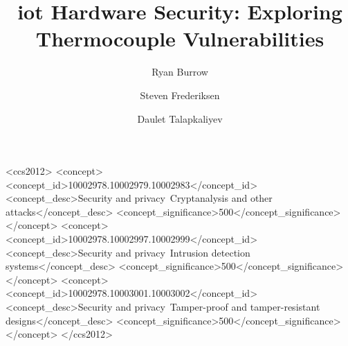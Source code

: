 \documentclass[sigconf,numbers,sort&compress]{acmart}
\begin{document}
\title{\ac{iot} Hardware Security: Exploring Thermocouple Vulnerabilities}

\author{Ryan Burrow}

\author{Steven Frederiksen}

\author{Daulet Talapkaliyev}




%
%
\begin{CCSXML}
<ccs2012>
<concept>
<concept_id>10002978.10002979.10002983</concept_id>
<concept_desc>Security and privacy~Cryptanalysis and other attacks</concept_desc>
<concept_significance>500</concept_significance>
</concept>
<concept>
<concept_id>10002978.10002997.10002999</concept_id>
<concept_desc>Security and privacy~Intrusion detection systems</concept_desc>
<concept_significance>500</concept_significance>
</concept>
<concept>
<concept_id>10002978.10003001.10003002</concept_id>
<concept_desc>Security and privacy~Tamper-proof and tamper-resistant designs</concept_desc>
<concept_significance>500</concept_significance>
</concept>
</ccs2012>
\end{CCSXML}



\maketitle

\printacronyms[include-classes=acron,name=List of Acronyms]










\appendix


\end{document}
